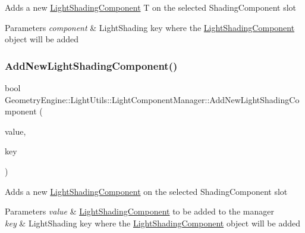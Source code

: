 Adds a new \mbox{\hyperlink{class_geometry_engine_1_1_light_utils_1_1_light_shading_component}{Light\+Shading\+Component}} T on the selected Shading\+Component slot 
\begin{DoxyParams}{Parameters}
{\em component} & Light\+Shading key where the \mbox{\hyperlink{class_geometry_engine_1_1_light_utils_1_1_light_shading_component}{Light\+Shading\+Component}} object will be added \\
\hline
\end{DoxyParams}
\mbox{\label{class_geometry_engine_1_1_light_utils_1_1_light_component_manager_a70a226e94e3f7369348e3ed9de7ee5bb}} 
\subsubsection{\texorpdfstring{AddNewLightShadingComponent()}{AddNewLightShadingComponent()}\hspace{0.1cm}{\footnotesize\ttfamily [2/2]}}
{\footnotesize\ttfamily bool Geometry\+Engine\+::\+Light\+Utils\+::\+Light\+Component\+Manager\+::\+Add\+New\+Light\+Shading\+Component (\begin{DoxyParamCaption}\item[{\mbox{\hyperlink{class_geometry_engine_1_1_light_utils_1_1_light_shading_component}{Light\+Shading\+Component}} $\ast$}]{value,  }\item[{\mbox{\hyperlink{namespace_geometry_engine_1_1_light_utils_a16eb370137c2fd151e6f8e1d07cd23e0}{Light\+Shading}}}]{key }\end{DoxyParamCaption})}

Adds a new \mbox{\hyperlink{class_geometry_engine_1_1_light_utils_1_1_light_shading_component}{Light\+Shading\+Component}} on the selected Shading\+Component slot 
\begin{DoxyParams}{Parameters}
{\em value} & \mbox{\hyperlink{class_geometry_engine_1_1_light_utils_1_1_light_shading_component}{Light\+Shading\+Component}} to be added to the manager \\
\hline
{\em key} & Light\+Shading key where the \mbox{\hyperlink{class_geometry_engine_1_1_light_utils_1_1_light_shading_component}{Light\+Shading\+Component}} object will be added \\
\hline
\end{DoxyParams}
\mbox{\label{class_geometry_engine_1_1_light_utils_1_1_light_component_manager_a21423f7a50b0a6c53370665d134e0d0d}} 
